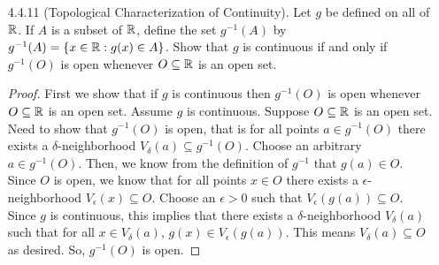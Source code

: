 \documentclass[12pt,letterpaper]{article}
\begin{document}
\begin{itemize}[leftmargin=!,labelindent=5pt]
            Yes
            \begin{proof}
                Assume $f$ is uniformly continuous on a bounded set $A$.
                Need to show that $f(A)$ is bounded.
                Let $\epsilon > 0$ be arbitrary.
                Since $f$ is uniformly continuous, there exists a $\delta > 0$ such that $\abs{x-y} < \delta$ implies $\abs{f(x) - f(y)} < \epsilon$ for $x,y \in A$.
                Since $A$ is bounded, there are a finite set of points $\{x_1, ..., x_n\}$ such that $\bigcup_{1 \leq i \leq n}(x_i - \delta, x_i + \delta)$ is a finite open cover of $A$.
                The image of the finite set of points $\{x_1, ..., x_n\}$ given by $\{f(x_1), ..., f(x_n)\}$ is also finite. 
                Since the image set is finite, it must have a supremum $s$ and infimum $l$.
                Then, $f$ is bounded above by $s + \epsilon$ and below by $l - \epsilon$.
                Thus, $f(A)$ is bounded.
            \end{proof}
        \item [4.4.11] (Topological Characterization of Continuity). Let $g$ be defined on all of $\mathbb{R}$. If $A$ is a subset of $\mathbb{R}$, define the set $g^{-1}(A)$ by $g^{-1}(A) = \{x \in \mathbb{R} : g(x) \in A\}$. Show that $g$ is continuous if and only if $g^{-1}(O)$ is open whenever $O \subseteq \mathbb{R}$ is an open set.
            \begin{proof}
                First we show that if $g$ is continuous then $g^{-1}(O)$ is open whenever $O \subseteq \mathbb{R}$ is an open set.
                Assume $g$ is continuous.
                Suppose $O \subseteq \mathbb{R}$ is an open set.
                Need to show that $g^{-1}(O)$ is open, that is for all points $a \in g^{-1}(O)$ there exists a $\delta$-neighborhood $V_\delta(a) \subseteq g^{-1}(O)$.
                Choose an arbitrary $a \in g^{-1}(O)$.
                Then, we know from the definition of $g^{-1}$ that $g(a) \in O$.
                Since $O$ is open, we know that for all points $x \in O$ there exists a $\epsilon$-neighborhood $V_\epsilon(x) \subseteq O$.
                Choose an $\epsilon > 0$ such that $V_\epsilon(g(a)) \subseteq O$.
                Since $g$ is continuous, this implies that there exists a $\delta$-neighborhood $V_\delta(a)$ such that for all $x \in V_\delta(a)$, $g(x) \in V_\epsilon(g(a))$.
                This means $V_\delta(a) \subseteq O$ as desired.
                So, $g^{-1}(O)$ is open.


\end{proof}
\end{itemize}
\end{document}
